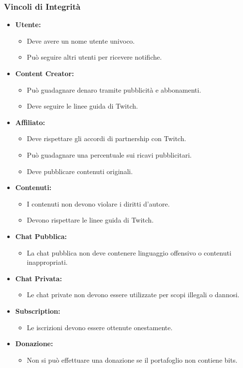 \subsubsection{Vincoli di Integrità}
\setlength{\parskip}{0.5em}

\begin{itemize}
\item \textbf{Utente:}
  \begin{itemize}
    \item Deve avere un nome utente univoco.
    \item Può seguire altri utenti per ricevere notifiche.
  \end{itemize}

\item \textbf{Content Creator:}
  \begin{itemize}
    \item Può guadagnare denaro tramite pubblicità e abbonamenti.
    \item Deve seguire le linee guida di Twitch.
  \end{itemize}

\item \textbf{Affiliato:}
  \begin{itemize}
    \item Deve rispettare gli accordi di partnership con Twitch.
    \item Può guadagnare una percentuale sui ricavi pubblicitari.
    \item Deve pubblicare contenuti originali.
  \end{itemize}

\item \textbf{Contenuti:}
  \begin{itemize}
    \item I contenuti non devono violare i diritti d'autore.
    \item Devono rispettare le linee guida di Twitch.
  \end{itemize}

\item \textbf{Chat Pubblica:}
  \begin{itemize}
    \item La chat pubblica non deve contenere linguaggio offensivo o contenuti inappropriati.
  \end{itemize}

\item \textbf{Chat Privata:}
  \begin{itemize}
    \item Le chat private non devono essere utilizzate per scopi illegali o dannosi.
  \end{itemize}

\item \textbf{Subscription:}
  \begin{itemize}
    \item Le iscrizioni devono essere ottenute onestamente.
  \end{itemize}

\item \textbf{Donazione:}
  \begin{itemize}
    \item Non si può effettuare una donazione se il portafoglio non contiene bits.
  \end{itemize}
\end{itemize}

